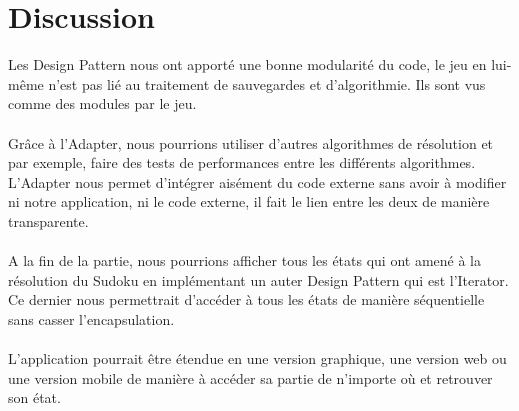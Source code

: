 \documentclass[a4paper]{article}
\begin{document}
\section{Discussion}
Les Design Pattern nous ont apporté une bonne modularité du code, le jeu en lui-même n'est pas lié au traitement de sauvegardes et d'algorithmie.
Ils sont vus comme des modules par le jeu.\\\\
Grâce à l'Adapter, nous pourrions utiliser d'autres algorithmes de résolution et par exemple, faire des tests de performances entre les différents algorithmes.
L'Adapter nous permet d'intégrer aisément du code externe sans avoir à modifier ni notre application, ni le code externe, il fait le lien entre les deux de manière transparente.\\\\
A la fin de la partie, nous pourrions afficher tous les états qui ont amené à la résolution du Sudoku en implémentant un auter Design Pattern qui est l'Iterator.
Ce dernier nous permettrait d'accéder à tous les états de manière séquentielle sans casser l'encapsulation.\\\\
L'application pourrait être étendue en une version graphique, une version web ou une version mobile de manière à accéder sa partie de n'importe où et retrouver son état.
\end{document}
